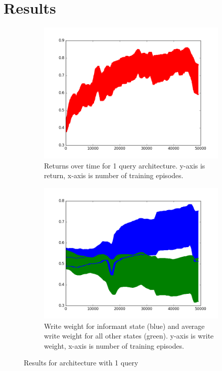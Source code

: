 \documentclass{article}
\begin{document}
\section*{Results}
\begin{figure}[!ht]
\centering
\begin{subfigure}[t]{.45\textwidth}
  \centering
      \includegraphics[width=1\textwidth]{images/1_query_mem_ret.png}
  \caption{Returns over time for 1 query architecture. y-axis is return, x-axis is number of training episodes.}
  \label{fig:1_query_ret}
\end{subfigure}\hfill
\begin{subfigure}[t]{.45\textwidth}
  \centering
      \includegraphics[width=1\textwidth]{images/1_query_mem_writes.png}
  \caption{Write weight for informant state (blue) and average write weight for all other states (green). y-axis is write weight, x-axis is number of training episodes.}
  \label{fig:1_query_write}
\end{subfigure}
\caption{Results for architecture with 1 query}
\label{fig:1_query}
\end{figure}
\end{document}
